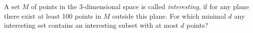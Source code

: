 \problem
A set $M$ of points in the 3-dimensional space is called \emph{interesting,}
if for any plane there exist at least 100 points in $M$ outside this plane.
For which minimal $d$ any interesting set contains an interesting subset with
at most $d$ points?
\solution
\endproblem
